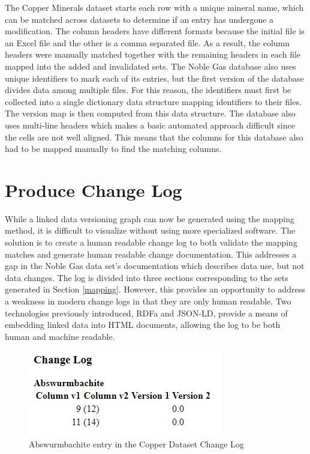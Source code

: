The Copper Minerals dataset starts each row with a unique mineral name, which can be matched across datasets to determine if an entry has undergone a modification.
The column headers have different formats because the initial file is an Excel file and the other is a comma separated file.
As a result, the column headers were manually matched together with the remaining headers in each file mapped into the added and invalidated sets.
The Noble Gas database also uses unique identifiers to mark each of its entries, but the first version of the database divides data among multiple files.
For this reason, the identifiers must first be collected into a single dictionary data structure mapping identifiers to their files.
The version map is then computed from this data structure.
The database also uses multi-line headers which makes a basic automated approach difficult since the cells are not well aligned.
This means that the columns for this database also had to be mapped manually to find the matching columns.

\section{Produce Change Log}

While a linked data versioning graph can now be generated using the mapping method, it is difficult to visualize without using more specialized software.
The solution is to create a human readable change log to both validate the mapping matches and generate human readable change documentation.
This addresses a gap in the Noble Gas data set's documentation which describes data use, but not data changes.
The log is divided into three sections corresponding to the sets generated in Section \ref{mapping}.
However, this provides an opportunity to address a weakness in modern change logs in that they are only human readable.
Two technologies previously introduced, RDFa and JSON-LD, provide a means of embedding linked data into HTML documents, allowing the log to be both human and machine readable.

\begin{figure}
	\centering
	\includegraphics[scale=0.80]{figures/Changelog-zoomed.png}
	\caption{Abswurmbachite entry in the Copper Dataset Change Log}
	\label{changelog_zoomed}
\end{figure}

